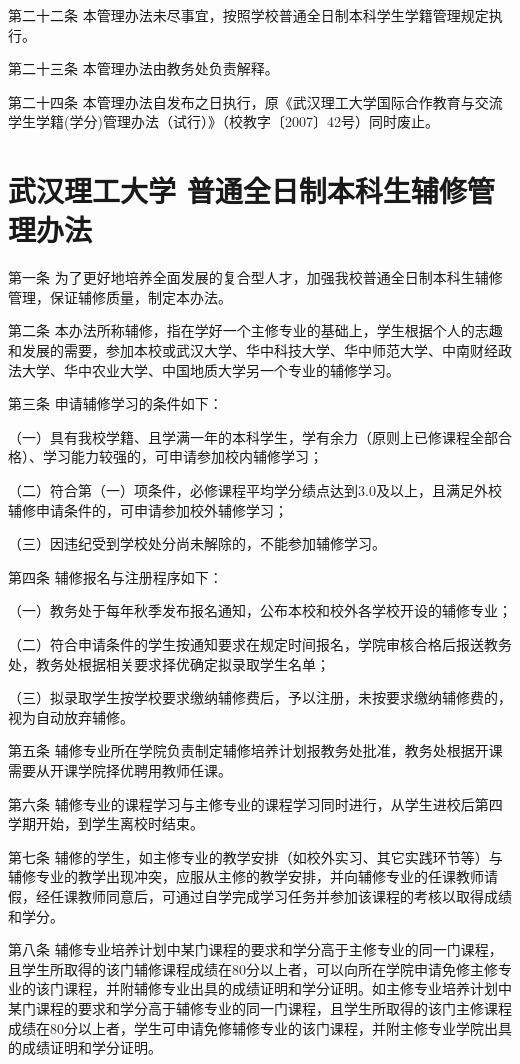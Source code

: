\documentclass[UTF8,12pt,a4paper]{report}
\begin{document}
第二十二条 本管理办法未尽事宜，按照学校普通全日制本科学生学籍管理规定执行。

第二十三条 本管理办法由教务处负责解释。

第二十四条 本管理办法自发布之日执行，原《武汉理工大学国际合作教育与交流学生学籍(学分)管理办法（试行）》（校教字〔2007〕42号）同时废止。

\chapter{武汉理工大学 普通全日制本科生辅修管理办法}
第一条  为了更好地培养全面发展的复合型人才，加强我校普通全日制本科生辅修管理，保证辅修质量，制定本办法。

第二条  本办法所称辅修，指在学好一个主修专业的基础上，学生根据个人的志趣和发展的需要，参加本校或武汉大学、华中科技大学、华中师范大学、中南财经政法大学、华中农业大学、中国地质大学另一个专业的辅修学习。

第三条  申请辅修学习的条件如下：

（一）具有我校学籍、且学满一年的本科学生，学有余力（原则上已修课程全部合格）、学习能力较强的，可申请参加校内辅修学习；

（二）符合第（一）项条件，必修课程平均学分绩点达到3.0及以上，且满足外校辅修申请条件的，可申请参加校外辅修学习；

（三）因违纪受到学校处分尚未解除的，不能参加辅修学习。

第四条  辅修报名与注册程序如下：

（一）教务处于每年秋季发布报名通知，公布本校和校外各学校开设的辅修专业；

（二）符合申请条件的学生按通知要求在规定时间报名，学院审核合格后报送教务处，教务处根据相关要求择优确定拟录取学生名单；

（三）拟录取学生按学校要求缴纳辅修费后，予以注册，未按要求缴纳辅修费的，视为自动放弃辅修。

第五条  辅修专业所在学院负责制定辅修培养计划报教务处批准，教务处根据开课需要从开课学院择优聘用教师任课。

第六条  辅修专业的课程学习与主修专业的课程学习同时进行，从学生进校后第四学期开始，到学生离校时结束。

第七条  辅修的学生，如主修专业的教学安排（如校外实习、其它实践环节等）与辅修专业的教学出现冲突，应服从主修的教学安排，并向辅修专业的任课教师请假，经任课教师同意后，可通过自学完成学习任务并参加该课程的考核以取得成绩和学分。

第八条  辅修专业培养计划中某门课程的要求和学分高于主修专业的同一门课程，且学生所取得的该门辅修课程成绩在80分以上者，可以向所在学院申请免修主修专业的该门课程，并附辅修专业出具的成绩证明和学分证明。如主修专业培养计划中某门课程的要求和学分高于辅修专业的同一门课程，且学生所取得的该门主修课程成绩在80分以上者，学生可申请免修辅修专业的该门课程，并附主修专业学院出具的成绩证明和学分证明。
\end{document}
